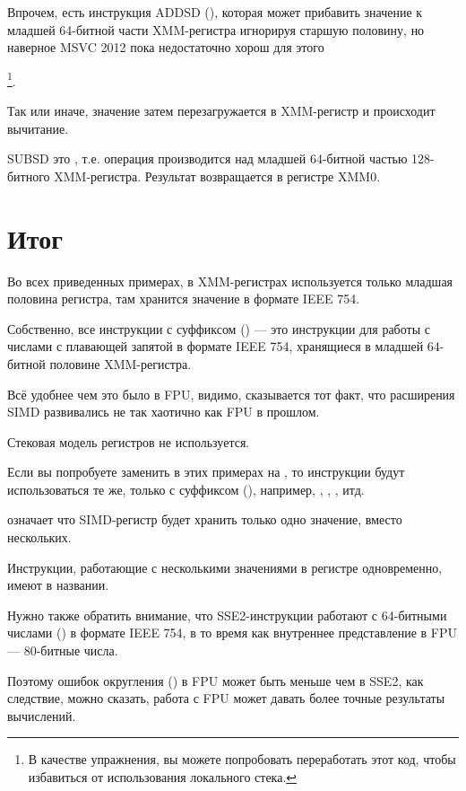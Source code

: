 Впрочем, есть инструкция ADDSD (),
которая может прибавить значение к младшей 64-битной части XMM-регистра игнорируя старшую половину,
но наверное MSVC 2012 пока недостаточно хорош для этого

\footnote{В качестве упражнения, вы можете попробовать переработать этот код, чтобы избавиться 
от использования локального стека.}.

Так или иначе, значение затем перезагружается в XMM-регистр и происходит вычитание.

SUBSD это , 
т.е. операция производится над младшей 64-битной частью 128-битного XMM-регистра.
Результат возвращается в регистре XMM0.



\section{Итог}

Во всех приведенных примерах, в XMM-регистрах используется только младшая половина регистра, там
хранится значение в формате IEEE 754.

Собственно, все инструкции с суффиксом 
 () --- это инструкции для работы с числами с плавающей 
запятой в формате IEEE 754, 
хранящиеся в младшей 64-битной половине XMM-регистра.

Всё удобнее чем это было в FPU, видимо, сказывается тот факт, что расширения 
SIMD развивались не так хаотично как FPU в прошлом.

Стековая модель регистров не используется.

Если вы попробуете заменить в этих примерах \Tdouble на \Tfloat{}, то инструкции будут использоваться те же,
только с суффиксом
(), например, , , , итд.

 означает что SIMD-регистр будет хранить только одно значение, вместо нескольких.

Инструкции, работающие с несколькими значениями в регистре одновременно, имеют  в названии.

Нужно также обратить внимание, что SSE2-инструкции работают с 64-битными числами (\Tdouble) в формате IEEE 754,
в то время как внутреннее представление в FPU --- 80-битные числа.

Поэтому ошибок округления () в FPU может быть меньше чем в SSE2,
как следствие, можно сказать, работа с FPU может давать более точные результаты вычислений.

